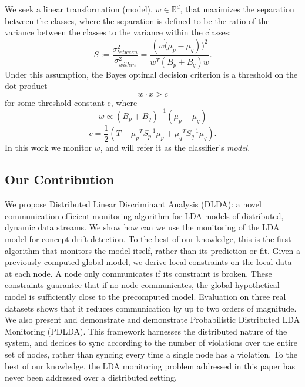 \documentclass[11pt,twocolumn,varwidth=true,a4paper,fleqn]{article}
\begin{document}
We seek a linear transformation (model), $w \in \mathbb{R}^d $,
that maximizes the separation between the classes, where the separation is
defined to be the ratio of the variance between the classes to the variance
within the classes:
\begin{equation*}
S := \frac{\sigma^2_{between}}{\sigma^2_{within}} = \frac{(w \dot (\mu_p -
\mu_q))^2}{w^T(B_p+B_q)w}.
\end{equation*}
Under this assumption, the Bayes optimal decision criterion is a threshold on the 
dot product
\begin{equation*} \label{eq:decision}
w \cdot x > c
\end{equation*}
for some threshold constant c, where
\begin{equation} \label{eq:w}
w \propto (B_p+B_q)^{-1}(\mu_p - \mu_q)
\end{equation}
\begin{equation} \label{eq:c}
c = \frac{1}{2}(T-{\mu_p}^T S_p^{-1} {\mu_p}+{\mu_q}^T S_q^{-1} {\mu_q}).
\end{equation}
In this work we monitor $w$, and will refer it as the
classifier's \textit{model}.
\subsection{Our Contribution}

We propose Distributed Linear Discriminant Analysis (DLDA): a novel
communication-efficient monitoring algorithm for LDA models of distributed, 
dynamic data streams.
We show how can we use the monitoring of the LDA model for concept drift
detection.
To the best of our knowledge, this is the first algorithm that monitors the
model itself, rather than its prediction or fit. Given a previously computed
global model, we derive local constraints on the local data at each node. A node only communicates
if its constraint is broken. These constraints guarantee that
if no node communicates, the global hypothetical model is
sufficiently close to the precomputed model.
Evaluation on three real datasets shows that it reduces communication by up to
two orders of magnitude. 
We also present and demonstrate and demonstrate 
Probabilistic Distributed LDA Monitoring (PDLDA). This framework harnesses the 
distributed nature of the system, and decides to sync according 
to the number of violations over the entire set of nodes, rather than syncing every
time a single node has a violation.
To the best of our knowledge, the LDA monitoring
problem addressed in this paper has never been addressed over a distributed
setting.
\end{document}
